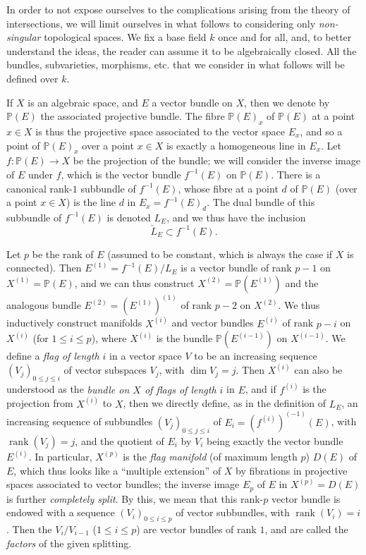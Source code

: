 \documentclass{article}
\begin{document}
In order to not expose ourselves to the complications arising from the theory of intersections, we will limit ourselves in what follows to considering only \emph{non-singular} topological spaces.
We fix a base field \(k\) once and for all, and, to better understand the ideas, the reader can assume it to be algebraically closed.
All the bundles, subvarieties, morphisms, etc. that we consider in what follows will be defined over \(k\).

If \(X\) is an algebraic space, and \(E\) a vector bundle on \(X\), then we denote by \(\mathbb{P}(E)\) the associated projective bundle.
The fibre \(\mathbb{P}(E)_x\) of \(\mathbb{P}(E)\) at a point \(x\in X\) is thus the projective space associated to the vector space \(E_x\), and so a point of \(\mathbb{P}(E)_x\) over a point \(x\in X\) is exactly a homogeneous line in \(E_x\).
Let \(f\colon\mathbb{P}(E)\to X\) be the projection of the bundle;
we will consider the inverse image of \(E\) under \(f\), which is the vector bundle \(f^{-1}(E)\) on \(\mathbb{P}(E)\).
There is a canonical rank-\(1\) subbundle of \(f^{-1}(E)\), whose fibre at a point \(d\) of \(\mathbb{P}(E)\) (over a point \(x\in X\)) is the line \(d\) in \(E_x=f^{-1}(E)_d\).
The dual bundle of this subbundle of \(f^{-1}(E)\) is denoted \(L_E\), and we thus have the inclusion
\[
  \check{L}_E \subset f^{-1}(E).
\]

Let \(p\) be the rank of \(E\) (assumed to be constant, which is always the case if \(X\) is connected).
Then \(E^{(1)}=f^{-1}(E)/L_E\) is a vector bundle of rank \(p-1\) on \(X^{(1)}=\mathbb{P}(E)\), and we can thus construct \(X^{(2)}=\mathbb{P}(E^{(1)})\) and the analogous bundle \(E^{(2)}=(E^{(1)})^{(1)}\) of rank \(p-2\) on \(X^{(2)}\).
We thus inductively construct manifolds \(X^{(i)}\) and vector bundles \(E^{(i)}\) of rank \(p-i\) on \(X^{(i)}\) (for \(1\leqslant i\leqslant p\)), where \(X^{(i)}\) is the bundle \(\mathbb{P}(E^{(i-1)})\) on \(X^{(i-1)}\).
We define a \emph{flag of length \(i\)} in a vector space \(V\) to be an increasing sequence \((V_j)_{0\leqslant j\leqslant i}\) of vector subspaces \(V_j\), with \(\dim V_j=j\).
Then \(X^{(i)}\) can also be understood as the \emph{bundle on \(X\) of flags of length \(i\)} in \(E\), and if \(f^{(i)}\) is the projection from \(X^{(i)}\) to \(X\), then we directly define, as in the definition of \(L_E\), an increasing sequence of subbundles \((V_j)_{0\leqslant j\leqslant i}\) of \(E_i=(f^{(i)})^{(-1)}(E)\), with \(\operatorname{rank}(V_j)=j\), and the quotient of \(E_i\) by \(V_i\) being exactly the vector bundle \(E^{(i)}\).
In particular, \(X^{(p)}\) is the \emph{flag manifold} (of maximum length \(p\)) \(D(E)\) of \(E\), which thus looks like a ``multiple extension'' of \(X\) by fibrations in projective spaces associated to vector bundles;
the inverse image \(E_p\) of \(E\) in \(X^{(p)}=D(E)\) is further \emph{completely split}.
By this, we mean that this rank-\(p\) vector bundle is endowed with a sequence \((V_i)_{0\leqslant i\leqslant p}\) of vector subbundles,
with \(\operatorname{rank}(V_i)=i\).
Then the \(V_i/V_{i-1}\) (\(1\leqslant i\leqslant p\)) are vector bundles of rank \(1\), and are called the \emph{factors} of the given splitting.
\end{document}
